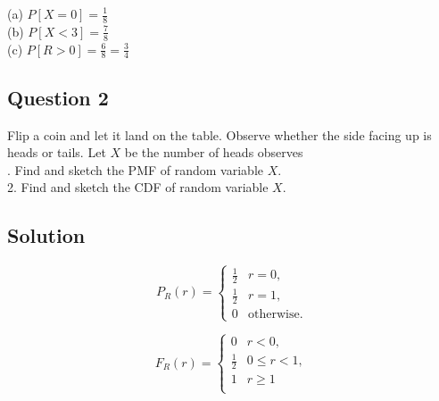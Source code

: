 \documentclass[12pt]{report} %
\begin{document}
\noindent (a) $P[X = 0] = \frac{1}{8}$ \\
(b) $P[X < 3] = \frac{7}{8}$ \\
(c) $P[R > 0] = \frac{6}{8} = \frac{3}{4}$ \\

\newpage

\subsection*{Question 2}

\noindent Flip a coin and let it land on the table. Observe whether
the side facing up is heads or tails. Let $X$ be the number of heads
observes \\

. Find and sketch the PMF of random variable $X$. \\
2. Find and sketch the CDF of random variable $X$. \\

\subsection*{Solution}
\[
P_R(r) =
\begin{cases}
\frac{1}{2} & r = 0, \\
\frac{1}{2} & r = 1, \\
0           & \text{otherwise}.
\end{cases}
\]

\begin{center}
\end{center}

\[
F_R(r) =
\begin{cases}
0 & r < 0, \\
\frac{1}{2} & 0 \le r < 1, \\
1 & r \ge 1 \\
\end{cases}
\]
\end{document}
